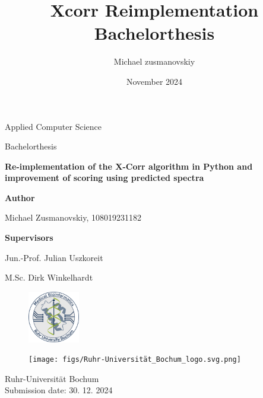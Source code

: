 \documentclass[11pt]{article}
\title{Xcorr Reimplementation Bachelorthesis}
\author{Michael zusmanovskiy}
\date{November 2024}
\begin{document}
\begin{titlepage}
    \begin{center}
        \LARGE
        Applied Computer Science

        \vspace{1cm}
        
        \LARGE
        Bachelorthesis

        \vspace{1cm}
            
        \LARGE
        \textbf{Re-implementation of the X-Corr algorithm in Python and improvement of scoring using predicted spectra}
            
        \vspace{1cm}

        \LARGE
        \textbf{Author}
        
        Michael Zusmanovskiy, 108019231182
        
        \vspace{1cm}
        
        \LARGE
        \textbf{Supervisors}
        
        Jun.-Prof. Julian Uszkoreit
        
        M.Sc. Dirk Winkelhardt
            
        \vfill
                \begin{figure}[ht]
            \centering
            \includegraphics[width=0.2\textwidth]{figs/medbioinf_logo-small.png}
        \end{figure}
        \begin{figure}[ht]
            \centering
            \texttt{[image: figs/Ruhr-Universität\_Bochum\_logo.svg.png]}
        \end{figure}
            
        \Large
        Ruhr-Universität Bochum\\
        
        Submission date: 30. 12. 2024
            
    \end{center}
\end{titlepage}

\newpage\null\thispagestyle{empty}\newpage
\end{document}
